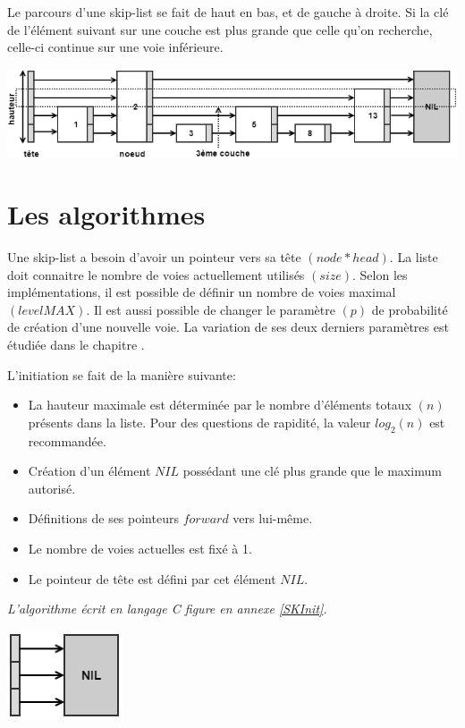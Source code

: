 \documentclass[hidelinks,a4paper, 12pt]{article}
\begin{document}
	Le parcours d'une skip-list se fait de haut en bas, et de gauche à droite. Si la clé de l'élément suivant sur une couche est plus grande que celle qu'on recherche, celle-ci continue sur une voie inférieure.	
	
	
	\begin{center}
		\includegraphics[width=\textwidth]{img/struct}
	\end{center}
	
	\newpage
	\section{Les algorithmes}
	Une skip-list a besoin d'avoir un pointeur vers sa tête $(node* head)$. La liste doit connaitre le nombre de voies actuellement utilisés $(size)$. Selon les implémentations, il est possible de définir un nombre de voies maximal $(levelMAX)$. Il est aussi possible de changer le paramètre $(p)$ de probabilité de création d'une nouvelle voie. La variation de ses deux derniers paramètres est étudiée dans le chapitre .
	
	
	L'initiation se fait de la manière suivante:
	\begin{itemize}
		\item La hauteur maximale est déterminée par le nombre d'éléments totaux $(n)$ présents dans la liste. Pour des questions de rapidité, la valeur $log_2(n)$ est recommandée.
		\item Création d'un élément $NIL$ possédant une clé plus grande que le maximum autorisé.
		\item Définitions de ses pointeurs $forward$ vers lui-même.
		\item Le nombre de voies actuelles est fixé à 1.
		\item Le pointeur de tête est défini par cet élément $NIL$.
	\end{itemize}
	\emph{L'algorithme écrit en langage C figure en annexe \ref{SKInit}.}
	
	\includegraphics{img/init}
	
\end{document}
